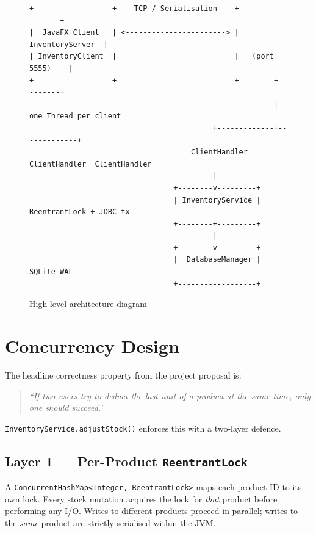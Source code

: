 \documentclass[12pt,a4paper]{article}
\begin{document}
\begin{figure}[H]
\centering
\begin{infobox}
\begin{lstlisting}[style=shell,numbers=none,basicstyle=\ttfamily\footnotesize]
+------------------+    TCP / Serialisation    +------------------+
|  JavaFX Client   | <-----------------------> | InventoryServer  |
| InventoryClient  |                           |   (port 5555)    |
+------------------+                           +--------+---------+
                                                        | one Thread per client
                                          +-------------+-------------+
                                     ClientHandler  ClientHandler  ClientHandler
                                          |
                                 +--------v---------+
                                 | InventoryService | ReentrantLock + JDBC tx
                                 +--------+---------+
                                          |
                                 +--------v---------+
                                 |  DatabaseManager | SQLite WAL
                                 +------------------+
\end{lstlisting}
\end{infobox}
\caption{High-level architecture diagram}
\end{figure}

\section{Concurrency Design}

The headline correctness property from the project proposal is:

\begin{quote}
\textit{``If two users try to deduct the last unit of a product at the same time,
only one should succeed.''}
\end{quote}

\texttt{InventoryService.adjustStock()} enforces this with a two-layer defence.

\subsection{Layer 1 --- Per-Product \texttt{ReentrantLock}}

A \texttt{ConcurrentHashMap<Integer, ReentrantLock>} maps each product ID to its
own lock. Every stock mutation acquires the lock for \emph{that} product before
performing any I/O. Writes to different products proceed in parallel; writes to the
\emph{same} product are strictly serialised within the JVM.
\end{document}
